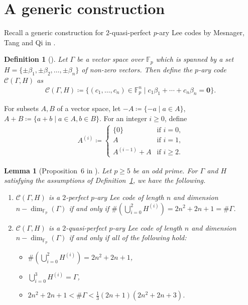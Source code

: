 \documentclass{amsart}
\newtheorem{lemma}[theorem]{Lemma}
\newtheorem{definition}[theorem]{Definition}
\numberwithin{equation}{section}
\newcommand{\F}{\mathbb{F}}
\begin{document}
\section{A generic construction}
Recall a generic construction for $2$-quasi-perfect $p$-ary Lee codes by Mesnager, Tang and Qi in \cite{MTQ2018}.

\begin{definition}[\cite{MTQ2018}]
\label{def-generic}
Let $\Gamma$ be a vector space over $\F_p$ which is spanned by a set $H=\{\pm \beta_1, \pm \beta_2, \ldots, \pm \beta_n\}$ of non-zero vectors.
Then define the $p$-ary code $\mathcal{C}(\Gamma, H)$ as 
\begin{align*}
    \mathcal{C}(\Gamma, H)\coloneq \{(c_1, \ldots,c_n) \in \F_p^n\mid c_1\beta_1+\cdots+c_n\beta_n=\mathbf{0}\}.
\end{align*}
\end{definition}

For subsets $A, B$ of a vector space, let $-A \coloneq \{-a \mid a\in A\}$, $A+B \coloneq \{a+b \mid a\in A, b\in B\}$.
For an integer $i\geq 0$, define 
\begin{align*}
    A^{(i)} \coloneq
  \begin{cases}
    \{0\} & \text{if $i=0$,} \\
    A                & \text{if $i=1$,} \\
    A^{(i-1)}+A      & \text{if $i\geq 2$.}
  \end{cases}
\end{align*}

\begin{lemma}[Proposition~6 in \cite{MTQ2018}]
\label{lem-generic}
Let $p\geq 5$ be an odd prime. 
For $\Gamma$ and $H$ satisfying the assumptions of Definition~\ref{def-generic}, we have the following.
\begin{enumerate}
    \item[$(1)$] $\mathcal{C}(\Gamma, H)$ is a $2$-perfect $p$-ary Lee code of length $n$ and dimension $n-\dim_{\F_p}(\Gamma)$ if and only if 
    $\#(\bigcup_{i=0}^{2} H^{(i)})=2n^2+2n+1=\#\Gamma$.
    
    \item[$(2)$] $\mathcal{C}(\Gamma, H)$ is a $2$-quasi-perfect $p$-ary Lee code of length $n$ and dimension $n-\dim_{\F_p}(\Gamma)$ if and only if all of the following hold:
    \begin{itemize}
        \item $\#(\bigcup_{i=0}^{2} H^{(i)})=2n^2+2n+1$,
        \item $\bigcup_{i=0}^{3} H^{(i)}=\Gamma$,
        \item $2n^2+2n+1 < \#\Gamma < \frac{1}{3}(2n+1)(2n^2+2n+3)$.
    \end{itemize}
\end{enumerate}
\end{lemma}
\end{document}
